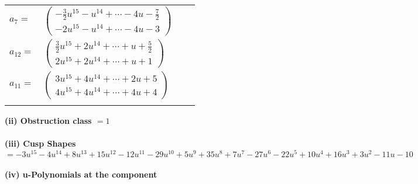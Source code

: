 \documentclass[1p]{elsarticle_modified}
\theoremstyle{definition}
\begin{document}
\begin{tabular}{m{7pt} m{180pt} m{7pt} m{180pt} }
\flushright $a_{7}=$&$\begin{pmatrix}-\frac{3}{2} u^{15}- u^{14}+\cdots-4 u-\frac{7}{2}\\-2 u^{15}- u^{14}+\cdots-4 u-3\end{pmatrix}$ \\
\flushright $a_{12}=$&$\begin{pmatrix}\frac{3}{2} u^{15}+2 u^{14}+\cdots+u+\frac{5}{2}\\2 u^{15}+2 u^{14}+\cdots+u+1\end{pmatrix}$ \\
\flushright $a_{11}=$&$\begin{pmatrix}3 u^{15}+4 u^{14}+\cdots+2 u+5\\4 u^{15}+4 u^{14}+\cdots+4 u+4\end{pmatrix}$\\&\end{tabular}
\flushleft \textbf{(ii) Obstruction class $= 1$}\\~\\
\flushleft \textbf{(iii) Cusp Shapes $= -3 u^{15}-4 u^{14}+8 u^{13}+15 u^{12}-12 u^{11}-29 u^{10}+5 u^9+35 u^8+7 u^7-27 u^6-22 u^5+10 u^4+16 u^3+3 u^2-11 u-10$}\\~\\
\newpage\renewcommand{\arraystretch}{1}
\flushleft \textbf{(iv) u-Polynomials at the component}\newline \\
\end{document}
